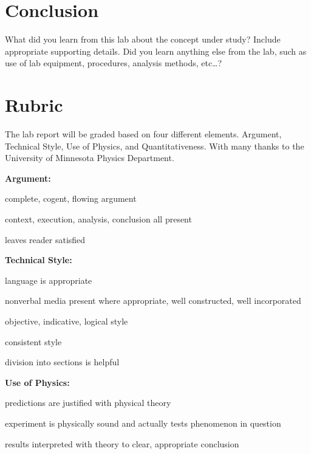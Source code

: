 \documentclass[
    10pt,aps,prl,
    amsfonts,
    amssymb,
    amsmath,
    runinaddress,
    secnum,
    showkeys,
    superscriptaddress,
    twocolumn,
]{revtex4}
\begin{document}
\section{Conclusion}
    \label{sec:conclusion}
    What did you learn from this lab about the concept under study? 
    Include appropriate supporting details. 
    Did you learn anything else from the lab, 
        such as use of lab equipment, procedures,
        analysis methods, etc\dots{}?


\appendix

\section{Rubric}
\label{sec:rubric}
    The lab report will be graded based on four different elements.
    Argument, Technical Style, Use of Physics, and Quantitativeness.
    With many thanks to the University of Minnesota Physics Department\cite{UMNrubric}.

    \textbf{Argument:}
    \begin{itemize*}
        \item complete, cogent, flowing argument
        \item context, execution, analysis, conclusion all present
        \item leaves reader satisfied
    \end{itemize*}

    \textbf{Technical Style:}
    \begin{itemize*}
        \item language is appropriate
        \item nonverbal media present where appropriate, well constructed, well incorporated
        \item objective, indicative, logical style
        \item consistent style
        \item division into sections is helpful
    \end{itemize*}

    \textbf{Use of Physics:}
    \begin{itemize*}
        \item predictions are justified with physical theory
        \item experiment is physically sound and actually tests phenomenon in question
        \item results interpreted with theory to clear, appropriate conclusion
    \end{itemize*}
\end{document}
